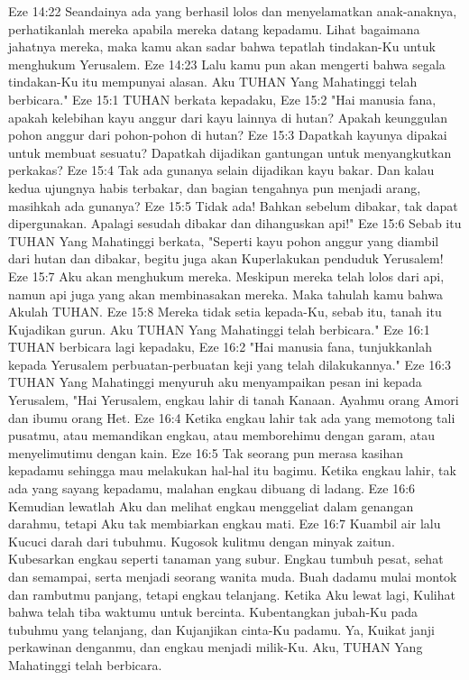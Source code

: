 Eze 14:22  Seandainya ada yang berhasil lolos dan menyelamatkan anak-anaknya, perhatikanlah mereka apabila mereka datang kepadamu. Lihat bagaimana jahatnya mereka, maka kamu akan sadar bahwa tepatlah tindakan-Ku untuk menghukum Yerusalem.
Eze 14:23  Lalu kamu pun akan mengerti bahwa segala tindakan-Ku itu mempunyai alasan. Aku TUHAN Yang Mahatinggi telah berbicara."
Eze 15:1  TUHAN berkata kepadaku,
Eze 15:2  "Hai manusia fana, apakah kelebihan kayu anggur dari kayu lainnya di hutan? Apakah keunggulan pohon anggur dari pohon-pohon di hutan?
Eze 15:3  Dapatkah kayunya dipakai untuk membuat sesuatu? Dapatkah dijadikan gantungan untuk menyangkutkan perkakas?
Eze 15:4  Tak ada gunanya selain dijadikan kayu bakar. Dan kalau kedua ujungnya habis terbakar, dan bagian tengahnya pun menjadi arang, masihkah ada gunanya?
Eze 15:5  Tidak ada! Bahkan sebelum dibakar, tak dapat dipergunakan. Apalagi sesudah dibakar dan dihanguskan api!"
Eze 15:6  Sebab itu TUHAN Yang Mahatinggi berkata, "Seperti kayu pohon anggur yang diambil dari hutan dan dibakar, begitu juga akan Kuperlakukan penduduk Yerusalem!
Eze 15:7  Aku akan menghukum mereka. Meskipun mereka telah lolos dari api, namun api juga yang akan membinasakan mereka. Maka tahulah kamu bahwa Akulah TUHAN.
Eze 15:8  Mereka tidak setia kepada-Ku, sebab itu, tanah itu Kujadikan gurun. Aku TUHAN Yang Mahatinggi telah berbicara."
Eze 16:1  TUHAN berbicara lagi kepadaku,
Eze 16:2  "Hai manusia fana, tunjukkanlah kepada Yerusalem perbuatan-perbuatan keji yang telah dilakukannya."
Eze 16:3  TUHAN Yang Mahatinggi menyuruh aku menyampaikan pesan ini kepada Yerusalem, "Hai Yerusalem, engkau lahir di tanah Kanaan. Ayahmu orang Amori dan ibumu orang Het.
Eze 16:4  Ketika engkau lahir tak ada yang memotong tali pusatmu, atau memandikan engkau, atau memborehimu dengan garam, atau menyelimutimu dengan kain.
Eze 16:5  Tak seorang pun merasa kasihan kepadamu sehingga mau melakukan hal-hal itu bagimu. Ketika engkau lahir, tak ada yang sayang kepadamu, malahan engkau dibuang di ladang.
Eze 16:6  Kemudian lewatlah Aku dan melihat engkau menggeliat dalam genangan darahmu, tetapi Aku tak membiarkan engkau mati.
Eze 16:7  Kuambil air lalu Kucuci darah dari tubuhmu. Kugosok kulitmu dengan minyak zaitun. Kubesarkan engkau seperti tanaman yang subur. Engkau tumbuh pesat, sehat dan semampai, serta menjadi seorang wanita muda. Buah dadamu mulai montok dan rambutmu panjang, tetapi engkau telanjang. Ketika Aku lewat lagi, Kulihat bahwa telah tiba waktumu untuk bercinta. Kubentangkan jubah-Ku pada tubuhmu yang telanjang, dan Kujanjikan cinta-Ku padamu. Ya, Kuikat janji perkawinan denganmu, dan engkau menjadi milik-Ku. Aku, TUHAN Yang Mahatinggi telah berbicara.
